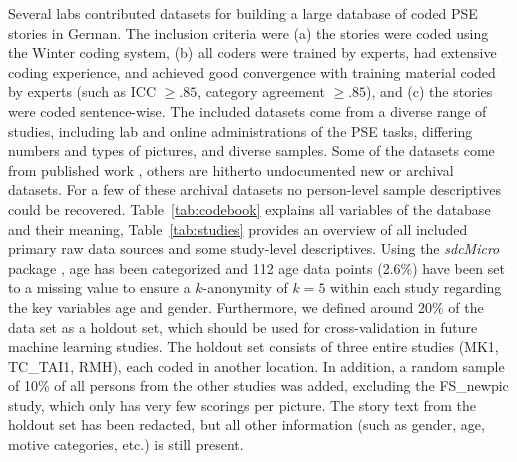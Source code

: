 \documentclass[jou,a4paper]{apa6}\usepackage[]{graphicx}\usepackage[]{color}
\begin{document}
Several labs contributed datasets for building a large database of coded PSE stories in German. The inclusion criteria were (a) the stories were coded using the Winter coding system, (b) all coders were trained by experts, had extensive coding experience, and achieved good convergence with training material coded by experts (such as ICC $\geq .85$, category agreement $\geq .85$), and (c) the stories were coded sentence-wise.
The included datasets come from a diverse range of studies, including lab and online administrations of the PSE tasks, differing numbers and types of pictures, and diverse samples. Some of the datasets come from published work \parencite[e.g.][]{schultheiss_ImplicitMotivesShow_2019,kollner_SocialBiopsychologyImplicit_2019,kollner_InfluenceImplicitMotives_2015,janson_InhibitedPowerMotivation_2018a,janson_ImplicitPowerMotive_2017,zygar_EinflussEmotionalerIntelligenz_2013,czikmantori_ExperienceIntrinsicMotivation_2018}, others are hitherto undocumented new or archival datasets. For a few of these archival datasets no person-level sample descriptives could be recovered. Table~\ref{tab:codebook} explains all variables of the database and their meaning, Table~\ref{tab:studies} provides an overview of all included primary raw data sources and some study-level descriptives. Using the \emph{sdcMicro} package \parencite{templ_StatisticalDisclosureControl_2015}, age has been categorized and 112 age data points (2.6\%) have been set to a missing value to ensure a $k$-anonymity of $k=5$ within each study regarding the key variables age and gender. Furthermore, we defined around 20\% of the data set as a holdout set, which should be used for cross-validation in future machine learning studies. The holdout set consists of three entire studies (MK1, TC\_TAI1, RMH), each coded in another location. In addition, a random sample of 10\% of all persons from the other studies was added, excluding the FS\_newpic study, which only has very few scorings per picture. The story text from the holdout set has been redacted, but all other information (such as gender, age, motive categories, etc.) is still present.
\end{document}
